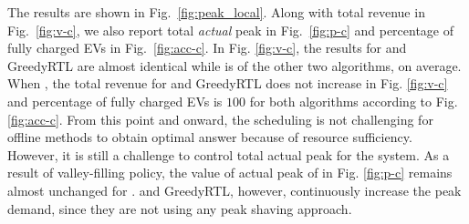 The results are shown in Fig.~\ref{fig:peak_local}.  
Along with total revenue in Fig.~\ref{fig:v-c}, we also report total \emph{actual} peak in Fig.~\ref{fig:p-c} and percentage of fully charged EVs in Fig.~\ref{fig:acc-c}. 
In Fig. \ref{fig:v-c}, the results for \ics and GreedyRTL are almost identical while \iocs is  of the other two algorithms, on average. When , the total revenue for \ics and GreedyRTL does not increase in Fig. \ref{fig:v-c} and percentage of fully charged EVs is $100$ for both algorithms according to Fig. \ref{fig:acc-c}. From this point and onward, the scheduling is not challenging for offline methods to obtain optimal answer because of resource sufficiency. However, it is still a challenge to control total actual peak for the system. As a result of valley-filling policy, the value of actual peak of \ics in Fig. \ref{fig:p-c} remains almost unchanged for .  \iocs and GreedyRTL, however, continuously increase the peak demand, since they are not using any peak shaving approach.
			
			
			
			
